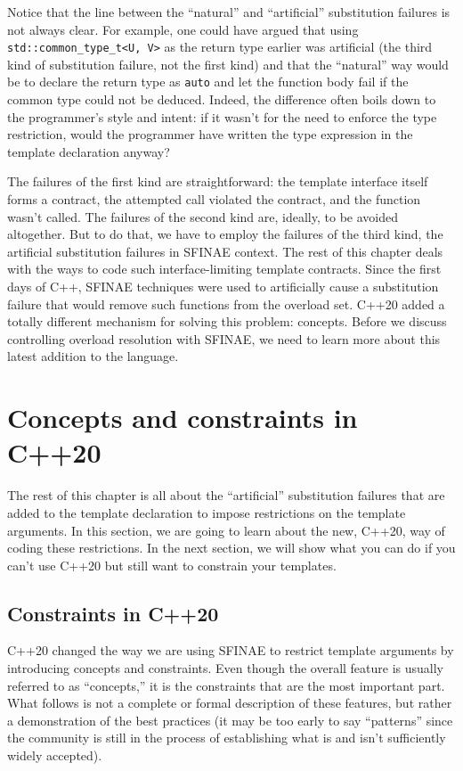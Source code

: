 Notice that the line between the ``natural'' and ``artificial'' substitution failures is not always clear. For example, one could have argued that using \texttt{std::common\_type\_t\textless{}U,\ V\textgreater{}} as the return type earlier was artificial (the third kind of substitution failure, not the first kind) and that the ``natural'' way would be to declare the return type as \texttt{auto} and let the function body fail if the common type could not be deduced. Indeed, the difference often boils down to the programmer's style and intent: if it wasn't for the need to enforce the type restriction, would the programmer have written the type expression in the template declaration anyway?

The failures of the first kind are straightforward: the template interface itself forms a contract, the attempted call violated the contract, and the function wasn't called. The failures of the second kind are, ideally, to be avoided altogether. But to do that, we have to employ the failures of the third kind, the artificial substitution failures in SFINAE context. The rest of this chapter deals with the ways to code such interface-limiting template contracts. Since the first days of C++, SFINAE techniques were used to artificially cause a substitution failure that would remove such functions from the overload set. C++20 added a totally different mechanism for solving this problem: concepts. Before we discuss controlling overload resolution with SFINAE, we need to learn more about this latest addition to the language.

\section{Concepts and constraints in C++20}

The rest of this chapter is all about the ``artificial'' substitution failures that are added to the template declaration to impose restrictions on the template arguments. In this section, we are going to learn about the new, C++20, way of coding these restrictions. In the next section, we will show what you can do if you can't use C++20 but still want to constrain your templates.

\subsection{Constraints in C++20}

C++20 changed the way we are using SFINAE to restrict template arguments by introducing concepts and constraints. Even though the overall feature is usually referred to as ``concepts,'' it is the constraints that are the most important part. What follows is not a complete or formal description of these features, but rather a demonstration of the best practices (it may be too early to say ``patterns'' since the community is still in the process of establishing what is and isn't sufficiently widely accepted).


